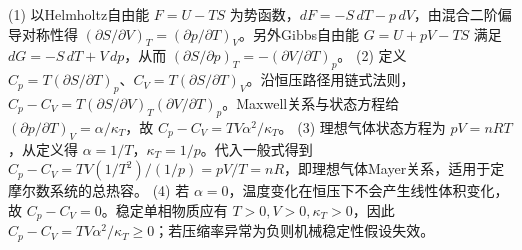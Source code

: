(1) 以Helmholtz自由能 \(F=U-TS\) 为势函数，\(dF=-S\,dT-p\,dV\)，由混合二阶偏导对称性得 \((\partial S/\partial V)_T=(\partial p/\partial T)_V\)。另外Gibbs自由能 \(G=U+pV-TS\) 满足 \(dG=-S\,dT+V\,dp\)，从而 \((\partial S/\partial p)_T=-(\partial V/\partial T)_p\)。
(2) 定义 \(C_p=T(\partial S/\partial T)_p\)、\(C_V=T(\partial S/\partial T)_V\)。沿恒压路径用链式法则，\(C_p-C_V=T(\partial S/\partial V)_T(\partial V/\partial T)_p\)。Maxwell关系与状态方程给 \((\partial p/\partial T)_V=\alpha/\kappa_T\)，故 \(C_p-C_V=TV\alpha^2/\kappa_T\)。
(3) 理想气体状态方程为 \(pV=nRT\)，从定义得 \(\alpha=1/T\)，\(\kappa_T=1/p\)。代入一般式得到 \(C_p-C_V=TV(1/T^2)/(1/p)=pV/T=nR\)，即理想气体Mayer关系，适用于定摩尔数系统的总热容。
(4) 若 \(\alpha=0\)，温度变化在恒压下不会产生线性体积变化，故 \(C_p-C_V=0\)。稳定单相物质应有 \(T>0,V>0,\kappa_T>0\)，因此 \(C_p-C_V=TV\alpha^2/\kappa_T\ge0\)；若压缩率异常为负则机械稳定性假设失效。
